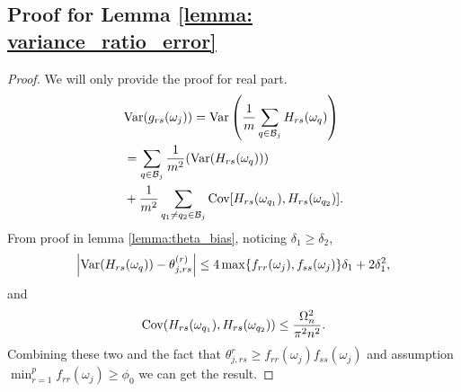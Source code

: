 \subsection{Proof for Lemma \ref{lemma: variance_ratio_error}}
\begin{proof}
We will only provide the proof for real part. 
\begin{equation}
\begin{aligned}
& \mathrm{Var}(g_{rs}(\omega_j)) = \mathrm{Var}\left(\frac{1}{m}\sum_{q\in \mathcal{B}_j} H_{rs}(\omega_q)\right) \\
& = \sum_{q\in \mathcal{B}_j} \frac{1}{m^2} (\mathrm{Var}(H_{rs}(\omega_q))) \\
& + \frac{1}{m^2} \sum_{q_1\neq q_2 \in \mathcal{B}_j} \mbox{Cov}[H_{rs}(\omega_{q_1}), H_{rs}(\omega_{q_2})].  
\end{aligned}
\end{equation}
From proof in lemma \ref{lemma:theta_bias}, noticing $\delta_1\ge \delta_2$, 
\[
\left|\mathrm{Var}(H_{rs}(\omega_q)) - \theta^{(r)}_{j, rs} \right| \le 4 \max\{f_{rr}(\omega_j), f_{ss}(\omega_j)\} \delta_1 + 2\delta_1^2, 
\]
and 
\[
\mbox{Cov} (H_{rs}(\omega_{q_1}), H_{rs}(\omega_{q_2})) \le \frac{\Omega_n^2}{\pi^2n^2}. 
\]
Combining these two and the fact that $\theta_{j, rs}^r\ge f_{rr}(\omega_j)f_{ss}(\omega_j)$ and assumption $\min_{r=1}^p f_{rr}(\omega_j)\ge \phi_0$ we can get the result. 
\end{proof}



